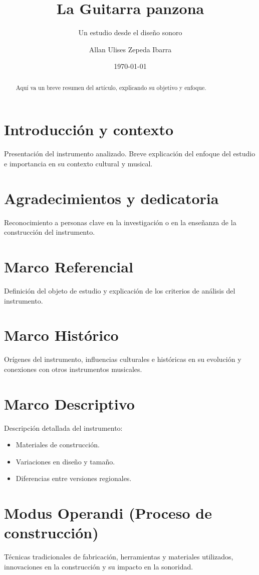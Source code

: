 \documentclass[a4paper,12pt]{article}
\title{La Guitarra panzona}
\subtitle{Un estudio desde el diseño sonoro}
\author{Allan Ulises Zepeda Ibarra}
\date{\today}
\begin{document}
\maketitle

\begin{abstract}
Aquí va un breve resumen del artículo, explicando su objetivo y enfoque.
\end{abstract}

\section{Introducción y contexto}
Presentación del instrumento analizado. Breve explicación del enfoque del estudio e importancia en su contexto cultural y musical. \cite{Vaca2008-oi}

\section{Agradecimientos y dedicatoria}
Reconocimiento a personas clave en la investigación o en la enseñanza de la construcción del instrumento.

\section{Marco Referencial}
Definición del objeto de estudio y explicación de los criterios de análisis del instrumento.

\section{Marco Histórico}
Orígenes del instrumento, influencias culturales e históricas en su evolución y conexiones con otros instrumentos musicales.

\section{Marco Descriptivo}
Descripción detallada del instrumento:
\begin{itemize}
    \item Materiales de construcción.
    \item Variaciones en diseño y tamaño.
    \item Diferencias entre versiones regionales.
\end{itemize}

\section{Modus Operandi (Proceso de construcción)}
Técnicas tradicionales de fabricación, herramientas y materiales utilizados, innovaciones en la construcción y su impacto en la sonoridad.
\end{document}
